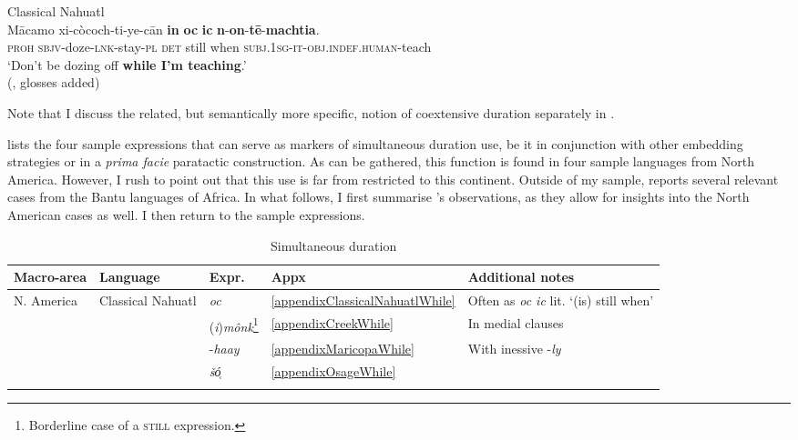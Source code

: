 \begin{exe}
	\ex Classical Nahuatl\label{exSimultaneousNahuatl1}\\
	\gll Mācamo xi-còcoch-ti-ye-cān \textbf{in} \textbf{oc} \textbf{ic} \textbf{n}-\textbf{on}-\textbf{tē}-\textbf{machtia}.\\
	\textsc{proh} \textsc{sbjv}-doze-\textsc{lnk}-stay-\textsc{pl} \textsc{det} still when \textsc{subj}.1\textsc{sg}-\textsc{it}-\textsc{obj}.\textsc{indef}.\textsc{human}-teach\\
	\glt \lq Don’t be dozing off \textbf{while I’m teaching}.'
	\\(\cite[366]{LauneyMackay2011},  glosses added) 
\end{exe}

Note that I discuss the related, but semantically more specific, notion of coextensive duration separately in .

 lists the four sample expressions that can serve as markers of simultaneous duration use, be it in conjunction with other embedding strategies or in a \textit{prima facie} paratactic construction. As can be gathered, this function is found in four sample languages from North America. However, I rush to point out that this use is far from restricted to this continent. Outside of my sample, \textcite{Gueldemann1998} reports several relevant cases from the Bantu languages of Africa. In what follows, I first summarise \citeauthor{Gueldemann1998}'s observations, as they allow for insights into the North American cases as well. I then return to the sample expressions.

\begin{table}
\caption{Simultaneous duration\label{tableWhile}}
\begin{tabularx}{\textwidth}{llllQ}
\lsptoprule
	Macro-area & Language & Expr. & Appx & Additional notes\\\midrule
	N. America & Classical Nahuatl & \textit{oc} &  \ref{appendixClassicalNahuatlWhile} & Often as \textit{oc ic} lit. \lq{}(is) still when'\\
	&  & (\textit{i})\textit{mônk}\footnote{Borderline case of a \textsc{still} expression.} & \ref{appendixCreekWhile} & In medial clauses\\
	&  & -\textit{haay} &  \ref{appendixMaricopaWhile} & With inessive -\textit{ly}\\
	&  & \textit{šó̜} &\ref{appendixOsageWhile}\\
\lspbottomrule
\end{tabularx}
\end{table}

